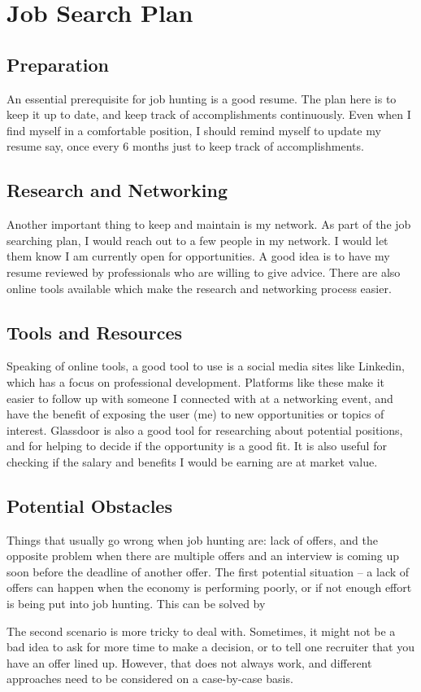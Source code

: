\section{Job Search Plan}

\subsection{Preparation}
An essential prerequisite for job hunting is a good resume. The plan here is to
keep it up to date, and keep track of accomplishments continuously. Even when I
find myself in a comfortable position, I should remind myself to update my
resume say, once every 6 months just to keep track of accomplishments. 

\subsection{Research and Networking}
Another important thing to keep and maintain is my network. As part of the job
searching plan, I would reach out to a few people in my network. I would let
them know I am currently open for opportunities. A good idea is to have my
resume reviewed by professionals who are willing to give advice. There are also
online tools available which make the research and networking process easier.

\subsection{Tools and Resources}
Speaking of online tools, a good tool to use is a social media sites like
Linkedin, which has a focus on professional development.  Platforms like these
make it easier to follow up with someone I connected with at a networking
event, and have the benefit of exposing the user (me) to new opportunities or
topics of interest. Glassdoor is also a good tool for researching about
potential positions, and for helping to decide if the opportunity is a good
fit.  It is also useful for checking if the salary and benefits I would be
earning are at market value.

\subsection{Potential Obstacles}
Things that usually go wrong when job hunting are: lack of offers, and the
opposite problem when there are multiple offers and an interview is coming up
soon before the deadline of another offer.  The first potential situation -- a
lack of offers can happen when the economy is performing poorly, or if not
enough effort is being put into job hunting. This can be solved by 

The second scenario is more tricky to deal with. Sometimes, it might not be a
bad idea to ask for more time to make a decision, or to tell one recruiter that
you have an offer lined up. However, that does not always work, and different
approaches need to be considered on a case-by-case basis. 
